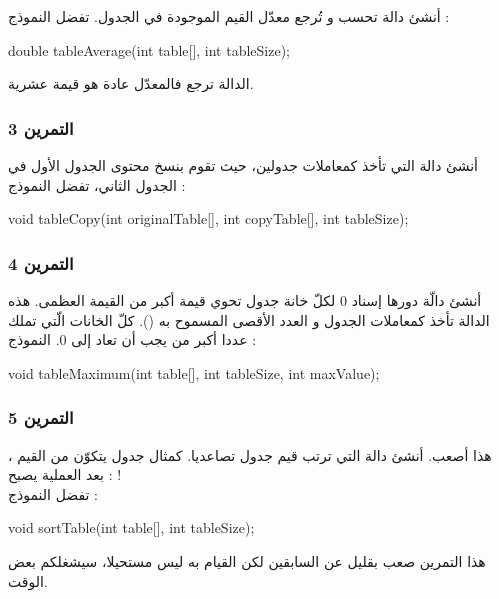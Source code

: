 أنشئ دالة
تحسب و تُرجع معدّل القيم الموجودة في الجدول. تفضل النموذج :

\begin{Csource}
double tableAverage(int table[], int tableSize);
\end{Csource}

الدالة ترجع
فالمعدّل عادة هو قيمة عشرية.

\subsubsection{التمرين 3}

أنشئ دالة
التي تأخذ كمعاملات جدولين، حيث تقوم بنسخ محتوى الجدول الأول في الجدول الثاني، تفضل النموذج :

\begin{Csource}
void tableCopy(int originalTable[], int copyTable[], int tableSize);
\end{Csource}

\subsubsection{التمرين 4}

أنشئ دالّة
دورها إسناد 0 لكلّ خانة جدول تحوي قيمة أكبر من القيمة العظمى. هذه الدالة تأخذ كمعاملات الجدول و العدد الأقصى المسموح به
().
كلّ الخانات الّتي تملك عددا أكبر من
يجب أن تعاد إلى 0. النموذج :

\begin{Csource}
void tableMaximum(int table[], int tableSize, int maxValue);
\end{Csource}

\subsubsection{التمرين 5}

هذا أصعب. أنشئ دالة
التي ترتب قيم جدول تصاعديا. كمثال جدول يتكوّن من القيم
،
بعد العملية يصبح :
 !\\
تفضل النموذج :

\begin{Csource}
void sortTable(int table[], int tableSize);
\end{Csource}

هذا التمرين صعب بقليل عن السابقين لكن القيام به ليس مستحيلا، سيشغلكم بعض الوقت.

